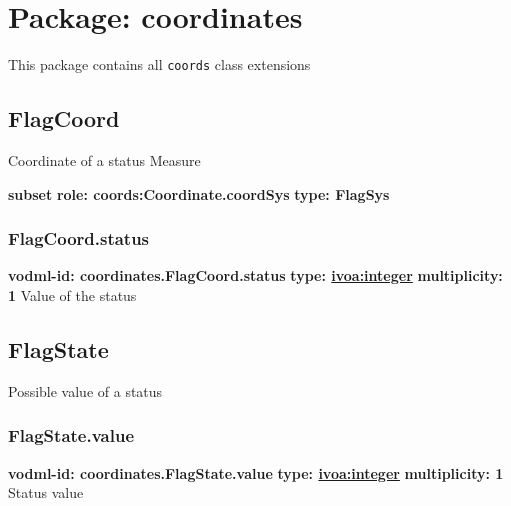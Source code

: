 \pagebreak
\section{Package: coordinates }


  This package contains all \texttt{coords} class extensions

  \subsection{FlagCoord}
  \label{sect:coordinates.FlagCoord}
    Coordinate of a status Measure

    \noindent \textbf{subset} \newline
    \indent   \textbf{role: coords:Coordinate.coordSys} \newline
    \indent   \textbf{type: FlagSys} \newline


    \subsubsection{FlagCoord.status}
      \textbf{vodml-id: coordinates.FlagCoord.status} \newline
      \textbf{type: \hyperref[sect:ivoa]{ivoa:integer}} \newline
      \textbf{multiplicity: 1} \newline 
      Value of the status

  \subsection{FlagState}
  \label{sect:coordinates.FlagState}
    Possible value of a status

    \subsubsection{FlagState.value}
      \textbf{vodml-id: coordinates.FlagState.value} \newline
      \textbf{type: \hyperref[sect:ivoa]{ivoa:integer}} \newline
      \textbf{multiplicity: 1} \newline 
      Status value

